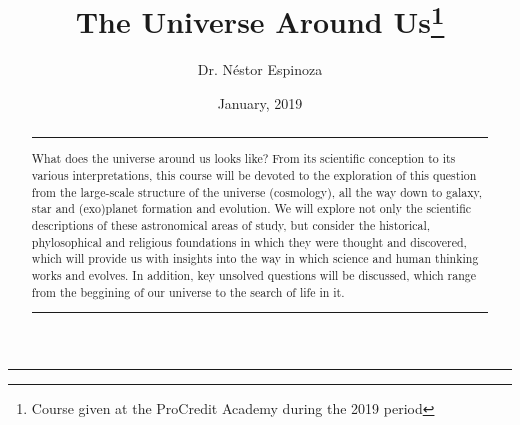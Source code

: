 \documentclass{tufte-handout}
\title{The Universe Around Us\thanks{Course given at the ProCredit Academy during the 2019 period}}
\author[Dr. N\'estor Espinoza]{Dr. N\'estor Espinoza}
\date{January, 2019}  %
\begin{document}
\noindent\textcolor{Red}{\rule{16cm}{3mm}}

{\let\newpage\relax\maketitle}

\begin{abstract}
\noindent\textcolor{Red}{\rule{10cm}{0.4mm}}
\noindent What does the universe around us looks like? From its scientific conception to its various interpretations, 
this course will be devoted to the exploration of this question from the large-scale structure of the universe (cosmology), all 
the way down to galaxy, star and (exo)planet formation and evolution. We will explore not only the scientific descriptions of these 
astronomical areas of study, but consider the historical, phylosophical and religious foundations in which they were thought and 
discovered, which will provide us with insights into the way in which science and human thinking works and evolves. In addition, key 
unsolved questions will be discussed, which range from the beggining of our universe to the search of life in it.
\noindent\textcolor{Red}{\rule{10cm}{0.4mm}}
\end{abstract}
\end{document}
